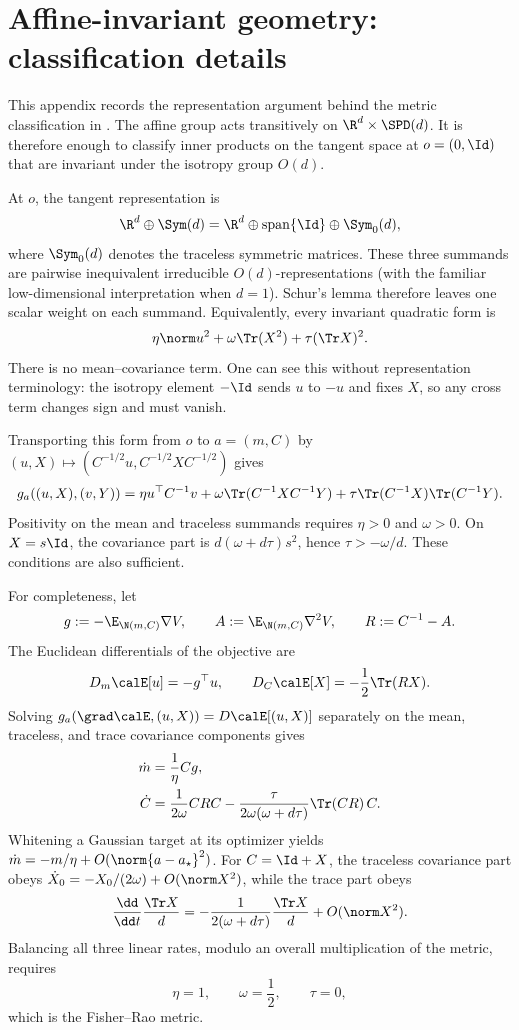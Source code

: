 \section{Affine-invariant geometry: classification details}
\label{app:affine-classification}

This appendix records the representation argument behind the metric
classification in .  The affine group acts transitively on
\(\R^d\times\SPD(d)\).  It is therefore enough to classify inner products on
the tangent space at \(o=(0,\Id)\) that are invariant under the isotropy group
\(O(d)\).

At \(o\), the tangent representation is
\[
  \R^d\oplus\Sym(d)
  =
  \R^d\oplus\operatorname{span}\{\Id\}\oplus\Sym_0(d),
\]
where \(\Sym_0(d)\) denotes the traceless symmetric matrices.  These three
summands are pairwise inequivalent irreducible \(O(d)\)-representations
(with the familiar low-dimensional interpretation when \(d=1\)).
Schur's lemma therefore leaves one scalar weight on each summand.
Equivalently, every invariant quadratic form is
\[
  \eta\norm u^2+\omega\Tr(X^2)+\tau(\Tr X)^2.
\]
There is no mean--covariance term.  One can see this without representation
terminology: the isotropy element \(-\Id\) sends \(u\) to \(-u\) and fixes
\(X\), so any cross term changes sign and must vanish.

Transporting this form from \(o\) to \(a=(m,C)\) by
\((u,X)\mapsto(C^{-1/2}u,C^{-1/2}XC^{-1/2})\) gives
\[
  g_a((u,X),(v,Y))
  =
  \eta u^\top C^{-1}v
  +\omega\Tr(C^{-1}XC^{-1}Y)
  +\tau\Tr(C^{-1}X)\Tr(C^{-1}Y).
\]
Positivity on the mean and traceless summands requires
\(\eta>0\) and \(\omega>0\).  On \(X=s\Id\), the covariance part is
\(d(\omega+d\tau)s^2\), hence
\(\tau>-\omega/d\).  These conditions are also sufficient.

For completeness, let
\[
  g:=-\E_{\N(m,C)}\nabla V,\qquad
  A:=\E_{\N(m,C)}\nabla^2V,\qquad
  R:=C^{-1}-A.
\]
The Euclidean differentials of the objective are
\[
  D_m\calE[u]=-g^\top u,\qquad
  D_C\calE[X]=-\frac12\Tr(RX).
\]
Solving
\(g_a(\grad\calE,(u,X))=D\calE[(u,X)]\) separately on the mean,
traceless, and trace covariance components gives
\begin{align*}
  \dot m
  &=\frac1\eta Cg,\\
  \dot C
  &=
  \frac1{2\omega}CRC
  -
  \frac{\tau}{2\omega(\omega+d\tau)}
  \Tr(CR)\,C.
\end{align*}
Whitening a Gaussian target at its optimizer yields
\(\dot m=-m/\eta+O(\norm{a-a_\star}^2)\).
For \(C=\Id+X\), the traceless covariance part obeys
\(\dot X_0=-X_0/(2\omega)+O(\norm X^2)\), while the trace part obeys
\[
  \frac{\dd}{\dd t}\frac{\Tr X}{d}
  =
  -\frac1{2(\omega+d\tau)}
  \frac{\Tr X}{d}
  +O(\norm X^2).
\]
Balancing all three linear rates, modulo an overall multiplication of the
metric, requires
\[
  \eta=1,\qquad \omega=\frac12,\qquad \tau=0,
\]
which is the Fisher--Rao metric.
